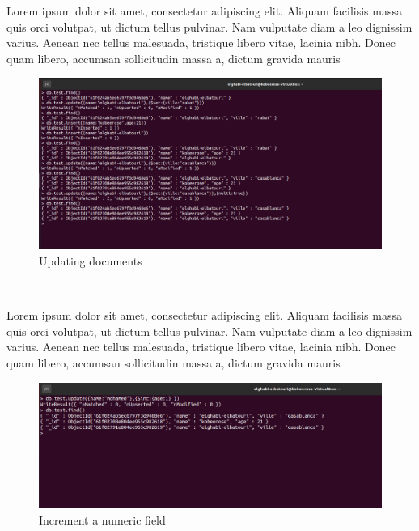 \begin{spacing}{1.2}
\par Lorem ipsum dolor sit amet, consectetur adipiscing elit. Aliquam facilisis massa quis orci volutpat, ut dictum tellus pulvinar. Nam vulputate diam a leo dignissim varius. Aenean nec tellus malesuada, tristique libero vitae, lacinia nibh. Donec quam libero, accumsan sollicitudin massa a, dictum gravida mauris
\\
\begin{figure}[!htb] 
\begin{center} 
\includegraphics[width=1\linewidth]{Pictures/MongoDB/Examining MongoDB Query Features/Deleting and Updating documents/Updating documents} 
\end{center} 
\caption{Updating documents} 
\end{figure}  \FloatBarrier
\\

\par Lorem ipsum dolor sit amet, consectetur adipiscing elit. Aliquam facilisis massa quis orci volutpat, ut dictum tellus pulvinar. Nam vulputate diam a leo dignissim varius. Aenean nec tellus malesuada, tristique libero vitae, lacinia nibh. Donec quam libero, accumsan sollicitudin massa a, dictum gravida mauris
\\
\begin{figure}[!htb] 
\begin{center} 
\includegraphics[width=1\linewidth]{Pictures/MongoDB/Examining MongoDB Query Features/Deleting and Updating documents/Increment a numeric field} 
\end{center} 
\caption{Increment a numeric field} 
\end{figure}  \FloatBarrier
\\


\end{spacing}
